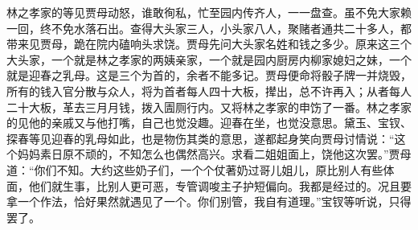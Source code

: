 \begin{parag}
    林之孝家的等见贾母动怒，谁敢徇私，忙至园内传齐人，一一盘查。虽不免大家赖一回，终不免水落石出。查得大头家三人，小头家八人，聚赌者通共二十多人，都带来见贾母，跪在院内磕响头求饶。贾母先问大头家名姓和钱之多少。原来这三个大头家，一个就是林之孝家的两姨亲家，一个就是园内厨房内柳家媳妇之妹，一个就是迎春之乳母。这是三个为首的，余者不能多记。贾母便命将骰子牌一并烧毁，所有的钱入官分散与众人，将为首者每人四十大板，撵出，总不许再入；从者每人二十大板，革去三月月钱，拨入圊厕行内。又将林之孝家的申饬了一番。林之孝家的见他的亲戚又与他打嘴，自己也觉没趣。迎春在坐，也觉没意思。黛玉、宝钗、探春等见迎春的乳母如此，也是物伤其类的意思，遂都起身笑向贾母讨情说：“这个妈妈素日原不顽的，不知怎么也偶然高兴。求看二姐姐面上，饶他这次罢。”贾母道：“你们不知。大约这些奶子们，一个个仗著奶过哥儿姐儿，原比别人有些体面，他们就生事，比别人更可恶，专管调唆主子护短偏向。我都是经过的。况且要拿一个作法，恰好果然就遇见了一个。你们别管，我自有道理。”宝钗等听说，只得罢了。
\end{parag}


